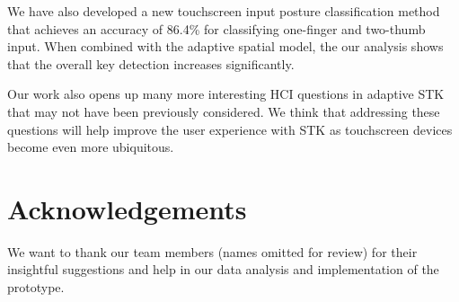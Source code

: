 \documentclass{sigchi}
\begin{document}
We have also developed a new touchscreen input posture classification method
that achieves an accuracy of 86.4\% for classifying one-finger and two-thumb input. When
combined with the adaptive spatial model, the our analysis shows that the overall key detection increases significantly.

Our work also opens up many more interesting HCI questions in adaptive STK
that may not have been previously considered. We think that addressing these questions
will help improve the user experience with STK as touchscreen
devices become even more ubiquitous.

\section{Acknowledgements}
We want to thank our team members (names omitted for review) for their insightful
suggestions and help in  our data analysis and implementation of the prototype.
\balance
\small


\end{document}
